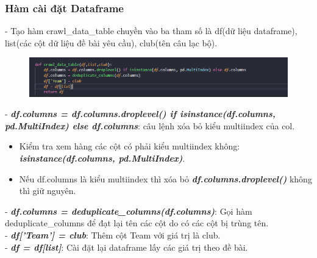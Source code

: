 \subsubsection{Hàm cài đặt Dataframe}
    - Tạo hàm crawl\_data\_table chuyền vào ba tham số là df(dữ liệu dataframe), list(các cột dữ liệu đề bài yêu cầu), club(tên câu lạc bộ).\\
    \begin{figure}[H]
        \centering
        \includegraphics[width=1\textwidth]{img/set_df.png}
    \end{figure}
    - \textbf{\textit{df.columns = df.columns.droplevel() if isinstance(df.columns, pd.MultiIndex) else df.columns}}: câu lệnh xóa bỏ kiểu multiindex của col.
    \begin{itemize}
        \item Kiểm tra xem hàng các cột có phải kiểu multiindex không: \textbf{\textit{isinstance(df.columns, pd.MultiIndex)}}.
        \item Nếu df.columns là kiểu multiindex thì xóa bỏ  \textbf{\textit{df.columns.droplevel()}} không thì giữ nguyên.
    \end{itemize}
    - \textbf{\textit{df.columns = deduplicate\_columns(df.columns)}}: Gọi hàm deduplicate\_columns để đạt lại tên các cột do có các cột bị trùng tên.\\
    - \textbf{\textit{df['Team'] = club}}: Thêm cột Team với giá trị là club.\\
    - \textbf{\textit{df = df[list]}}: Cài đặt lại dataframe lấy các giá trị theo đề bài.

